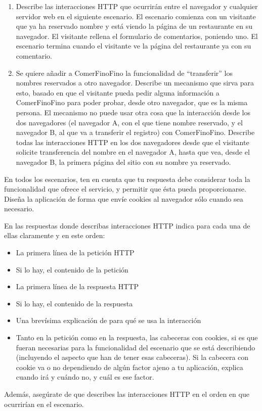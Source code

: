 \begin{enumerate}
\item Describe las interacciones HTTP que ocurrirán entre el navegador y cualquier servidor web en el siguiente escenario. El escenario comienza con un visitante que ya ha reservado nombre y está viendo la página de un restaurante en su navegador. El visitante rellena el formulario de comentarios, poniendo uno. El escenario termina cuando el visitante ve la página del restaurante ya con su comentario.

\item Se quiere añadir a ComerFinoFino la funcionalidad de ``transferir'' los nombres reservados a otro navegador. Describe un mecanismo que sirva para esto, basado en que el visitante pueda pedir alguna información a ComerFinoFino para poder probar, desde otro navegador, que es la misma persona. El mecanismo no puede usar otra cosa que la interacción desde los dos navegadores (el navegador A, con el que tiene nombre reservado, y el navegador B, al que va a transferir el registro) con ComerFinoFino. Describe todas las interacciones HTTP en los dos navegadores desde que el visitante solicite transferencia del nombre en el navegador A, hasta que vea, desde el navegador B, la primera página del sitio con su nombre ya reservado.
\end{enumerate}

En todos los escenarios, ten en cuenta que tu respuesta debe considerar toda la funcionalidad que ofrece el servicio, y permitir que ésta pueda proporcionarse. Diseña la aplicación de forma que envíe cookies al navegador sólo cuando sea necesario.

En las respuestas donde describas interacciones HTTP indica para cada una de ellas claramente y en este orden:
  \begin{itemize}
  \item La primera línea de la petición HTTP
  \item Si lo hay, el contenido de la petición
  \item La primera línea de la respuesta HTTP
  \item Si lo hay, el contenido de la respuesta
  \item Una brevísima explicación de para qué se usa la interacción
  \item Tanto en la petición como en la respuesta, las cabeceras con cookies, si es que fueran necesarias para la funcionalidad del escenario que se está describiendo (incluyendo el aspecto que han de tener esas cabeceras). Si la cabecera con cookie va o no dependiendo de algún factor ajeno a tu aplicación, explica cuando irá y cuándo no, y cuál es ese factor.
  \end{itemize}

Además, asegúrate de que describes las interacciones HTTP en el orden en que ocurrirían en el escenario.

